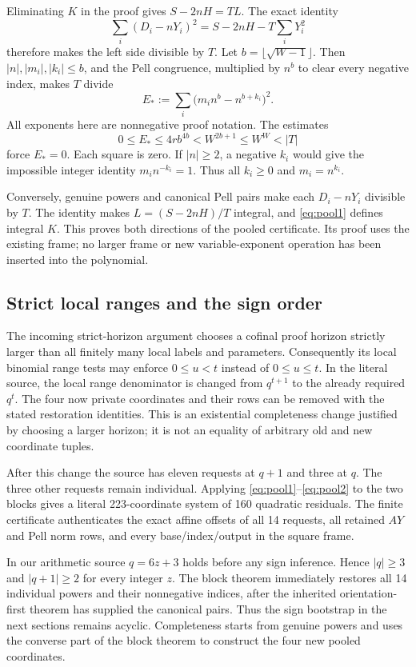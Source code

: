 Eliminating $K$ in the proof gives $S-2nH=TL$. The exact identity
\[
 \sum_i(D_i-nY_i)^2=S-2nH-T\sum_iY_i^2
\]
therefore makes the left side divisible by $T$.
Let $b=\lfloor\sqrt{W-1}\rfloor$. Then
$|n|,|m_i|,|k_i|\le b$, and the Pell congruence, multiplied by
$n^b$ to clear every negative index, makes $T$ divide
\[
 E_*:=\sum_i\bigl(m_i n^b-n^{b+k_i}\bigr)^2.
\]
All exponents here are nonnegative proof notation. The estimates
\[
 0\le E_*\le4r b^{4b}<W^{2b+1}\le W^W<|T|
\]
force $E_*=0$. Each square is zero. If $|n|\ge2$, a negative
$k_i$ would give the impossible integer identity $m_i n^{-k_i}=1$.
Thus all $k_i\ge0$ and $m_i=n^{k_i}$.

Conversely, genuine powers and canonical Pell pairs make each
$D_i-nY_i$ divisible by $T$. The identity makes
$L=(S-2nH)/T$ integral, and \eqref{eq:pool1} defines integral $K$.
This proves both directions of the pooled certificate. Its proof uses
the existing frame; no larger frame or new variable-exponent operation
has been inserted into the polynomial.

\subsection{Strict local ranges and the sign order}

The incoming strict-horizon argument chooses a cofinal proof horizon
strictly larger than all finitely many local labels and parameters.
Consequently its local binomial range tests may enforce $0\le u<t$
instead of $0\le u\le t$. In the literal source, the local range
denominator is changed from $q^{t+1}$ to the already required $q^t$.
The four now private coordinates and their rows can be removed with
the stated restoration identities. This is an existential completeness
change justified by choosing a larger horizon; it is not an equality
of arbitrary old and new coordinate tuples.

After this change the source has eleven requests at $q+1$ and three at
$q$. The three other requests remain individual. Applying
\eqref{eq:pool1}--\eqref{eq:pool2} to the two blocks gives a literal
223-coordinate system of 160 quadratic residuals. The finite certificate
authenticates the exact affine offsets of all 14 requests, all retained
$AY$ and Pell norm rows, and every base/index/output in the square frame.

In our arithmetic source $q=6z+3$ holds before any sign inference.
Hence $|q|\ge3$ and $|q+1|\ge2$ for every integer $z$. The block
theorem immediately restores all 14 individual powers and their
nonnegative indices, after the inherited orientation-first theorem
has supplied the canonical pairs. Thus the sign bootstrap in the next
sections remains acyclic. Completeness starts from genuine powers and
uses the converse part of the block theorem to construct the four new
pooled coordinates.

